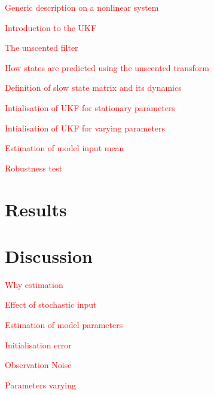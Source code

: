 \documentclass{article}%
\newcommand\red{\textcolor{red}}
\begin{document}
\red{Generic description on a nonlinear system}

\red{Introduction to the UKF}

\red{The unscented filter}

\red{How states are predicted using the unscented transform}

\red{Definition of slow state matrix and its dynamics}

\red{Intialisation of UKF for stationary parameters}


\red{Intialisation of UKF for varying parameters}

\red{Estimation of model input mean}

\red{Robustness test}

\section{Results}

\section{Discussion}

\red{Why estimation}

\red{Effect of stochastic input}

\red{Estimation of model parameters}

\red{Initialisation error}

\red{Observation Noise}

\red{Parameters varying}

% 
% 
% 
% 
% 
% 



\end{document}
